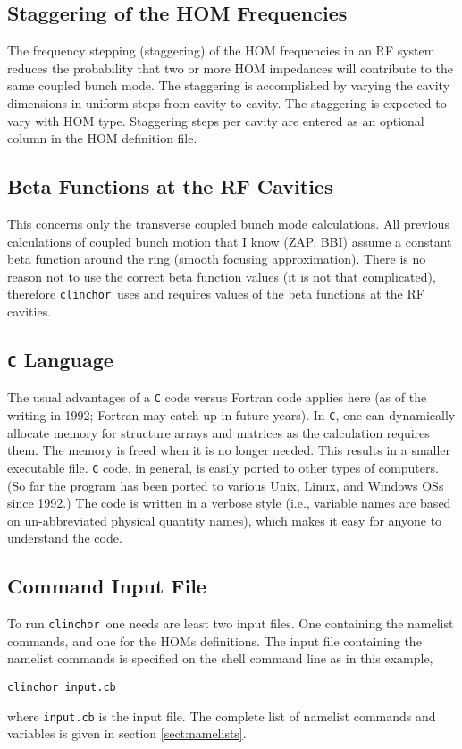 \documentclass[11pt]{article}
\newcommand{\clinchor}{{\tt clinchor}}
\begin{document}
\subsection{Staggering of the HOM Frequencies}

The frequency stepping (staggering) of the HOM frequencies in an RF system
reduces the probability that two or more HOM impedances will contribute to
the same coupled bunch mode.  
The staggering is accomplished by varying
the cavity dimensions in uniform steps from cavity to cavity. The
staggering is expected to vary with HOM type.  Staggering steps per
cavity are entered as an optional column in the HOM definition file.

\subsection{Beta Functions at the RF Cavities}
This concerns only the transverse coupled bunch mode calculations.
All previous calculations of coupled bunch motion that I know (ZAP,
BBI) assume a constant beta function around the ring (smooth focusing
approximation).  
There is no reason not to use the correct beta function values (it is not
that complicated), therefore \clinchor\ uses and requires values of the
beta functions at the RF cavities.

\subsection{{\tt C} Language}
The usual advantages of a {\tt C} code versus Fortran code applies here (as of the writing in 1992; Fortran may catch up in future years).
In  {\tt C}, one can dynamically allocate memory for structure arrays and
matrices as the calculation requires them. The memory is freed when it
is no longer needed. This results in a smaller executable file. {\tt C}
code, in general, is easily ported to other types of computers. 
(So far the program has been ported to various Unix, Linux, and Windows OSs
since 1992.) 
The code is written in a verbose style (i.e., variable names are based on
un-abbreviated physical quantity names), which makes it easy for anyone to
understand the code.

\subsection{Command Input File}
To run \clinchor\ one needs are least two input files. One containing
the namelist commands, and one for the HOMs definitions.  The input
file containing the namelist commands is specified on the shell
command line as in this example,
\begin{verbatim}
clinchor input.cb
\end{verbatim}
where {\tt input.cb} is the input file. The complete list of namelist
commands and variables is given in section \ref{sect:namelists}.
\end{document}
